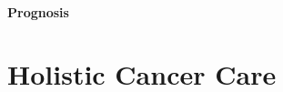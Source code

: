 \documentclass[12pt, a4paper]{article}
\begin{document}
\paragraph{Prognosis}














\section*{Holistic Cancer Care}

\end{document}
